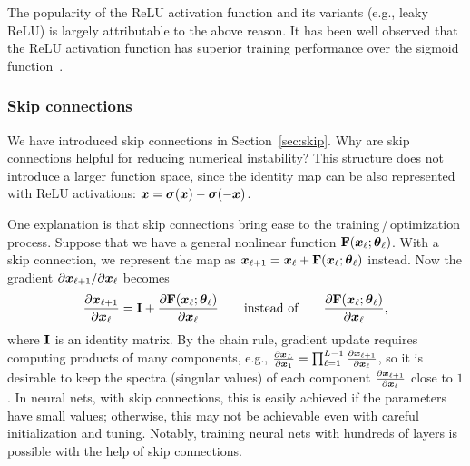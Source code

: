 The popularity of the ReLU activation function and its variants (e.g., leaky ReLU) is largely attributable to the above reason. It has been well observed that the ReLU activation function has superior training performance over the sigmoid function~\citep{krizhevsky2012imagenet, maas2013rectifier}.

\subsubsection{Skip connections}

We have introduced skip connections in Section~\ref{sec:skip}. Why are skip connections helpful for reducing numerical instability? This structure does not introduce a larger function space, since the identity map can be also represented with ReLU activations: $\text{\boldmath $x$} = \bm{\sigma}(\text{\boldmath $x$}) - \bm{\sigma}(-\text{\boldmath $x$})$.

One explanation is that skip connections bring ease to the training$\,$/$\,$optimization process. Suppose that we have a general nonlinear function $\mathrm{\bf F}(\text{\boldmath $x$}_\ell; \text{\boldmath $\theta$}_{\ell})$. With a skip connection, we represent the map as $\text{\boldmath $x$}_{\ell+1} = \text{\boldmath $x$}_\ell + \mathrm{\bf F}(\text{\boldmath $x$}_\ell; \text{\boldmath $\theta$}_{\ell})$ instead. Now the gradient $\partial \text{\boldmath $x$}_{\ell+1} / \partial \text{\boldmath $x$}_{\ell}$ becomes
\begin{equation}\label{eq:skipgrad}
\frac{\partial \text{\boldmath $x$}_{\ell+1}}{\partial \text{\boldmath $x$}_{\ell}} = \mathrm{\bf I} + \frac{\partial \mathrm{\bf F}(\text{\boldmath $x$}_\ell; \text{\boldmath $\theta$}_{\ell})}{\partial \text{\boldmath $x$}_\ell} \qquad \text{instead of} \qquad \frac{\partial \mathrm{\bf F}(\text{\boldmath $x$}_\ell; \text{\boldmath $\theta$}_{\ell})}{\partial \text{\boldmath $x$}_\ell},
\end{equation}
where $\mathrm{\bf I}$ is an identity matrix. By the chain rule, gradient update requires computing products of many components, e.g., $\frac{\partial \text{\boldmath $x$}_L}{\partial \text{\boldmath $x$}_1} = \prod_{\ell=1}^{L-1} \frac{\partial \text{\boldmath $x$}_{\ell+1}}{\partial \text{\boldmath $x$}_\ell}$, so it is desirable to keep the spectra (singular values) of each component $\frac{\partial \text{\boldmath $x$}_{\ell+1}}{\partial \text{\boldmath $x$}_\ell}$ close to $1$. In neural nets, with skip connections, this is easily achieved if the parameters have small values; otherwise, this may not be achievable even with careful initialization and tuning. Notably, training neural nets with hundreds of layers is possible with the help of skip connections.


